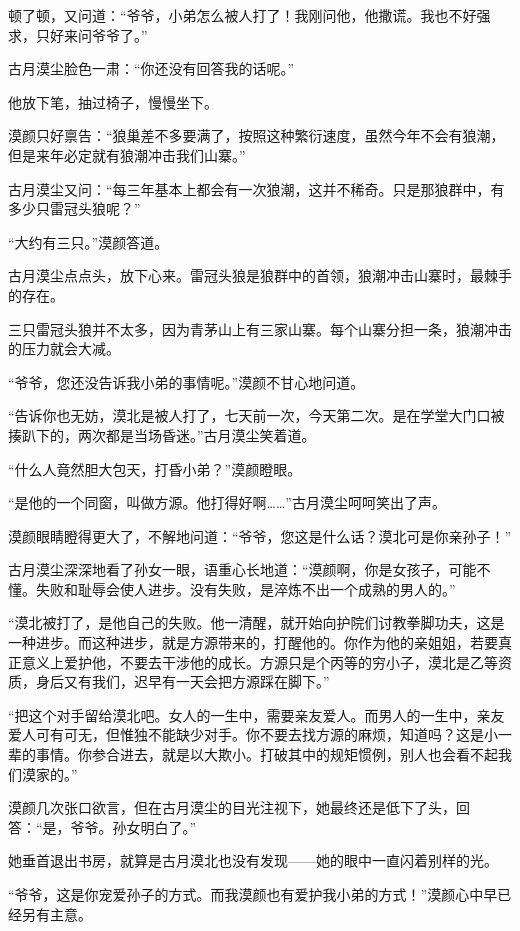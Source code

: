 \begin{this_body}
顿了顿，又问道：“爷爷，小弟怎么被人打了！我刚问他，他撒谎。我也不好强求，只好来问爷爷了。”

古月漠尘脸色一肃：“你还没有回答我的话呢。”

他放下笔，抽过椅子，慢慢坐下。

漠颜只好禀告：“狼巢差不多要满了，按照这种繁衍速度，虽然今年不会有狼潮，但是来年必定就有狼潮冲击我们山寨。”

古月漠尘又问：“每三年基本上都会有一次狼潮，这并不稀奇。只是那狼群中，有多少只雷冠头狼呢？”

“大约有三只。”漠颜答道。

古月漠尘点点头，放下心来。雷冠头狼是狼群中的首领，狼潮冲击山寨时，最棘手的存在。

三只雷冠头狼并不太多，因为青茅山上有三家山寨。每个山寨分担一条，狼潮冲击的压力就会大减。

“爷爷，您还没告诉我小弟的事情呢。”漠颜不甘心地问道。

“告诉你也无妨，漠北是被人打了，七天前一次，今天第二次。是在学堂大门口被揍趴下的，两次都是当场昏迷。”古月漠尘笑着道。

“什么人竟然胆大包天，打昏小弟？”漠颜瞪眼。

“是他的一个同窗，叫做方源。他打得好啊……”古月漠尘呵呵笑出了声。

漠颜眼睛瞪得更大了，不解地问道：“爷爷，您这是什么话？漠北可是你亲孙子！”

古月漠尘深深地看了孙女一眼，语重心长地道：“漠颜啊，你是女孩子，可能不懂。失败和耻辱会使人进步。没有失败，是淬炼不出一个成熟的男人的。”

“漠北被打了，是他自己的失败。他一清醒，就开始向护院们讨教拳脚功夫，这是一种进步。而这种进步，就是方源带来的，打醒他的。你作为他的亲姐姐，若要真正意义上爱护他，不要去干涉他的成长。方源只是个丙等的穷小子，漠北是乙等资质，身后又有我们，迟早有一天会把方源踩在脚下。”

“把这个对手留给漠北吧。女人的一生中，需要亲友爱人。而男人的一生中，亲友爱人可有可无，但惟独不能缺少对手。你不要去找方源的麻烦，知道吗？这是小一辈的事情。你参合进去，就是以大欺小。打破其中的规矩惯例，别人也会看不起我们漠家的。”

漠颜几次张口欲言，但在古月漠尘的目光注视下，她最终还是低下了头，回答：“是，爷爷。孙女明白了。”

她垂首退出书房，就算是古月漠北也没有发现——她的眼中一直闪着别样的光。

“爷爷，这是你宠爱孙子的方式。而我漠颜也有爱护我小弟的方式！”漠颜心中早已经另有主意。


\end{this_body}
